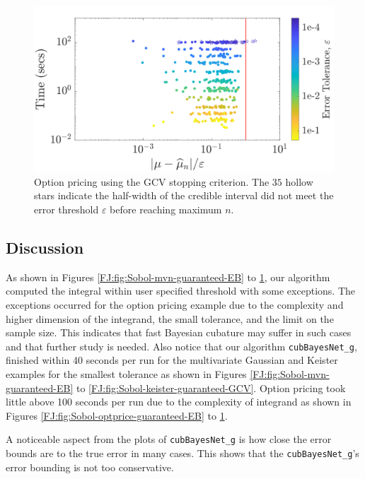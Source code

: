 \documentclass[graybox,footinfo]{svmult}
\begin{document}
\begin{figure}
\centering
\includegraphics[width=0.95\linewidth]{"figures/Sobol/Sobol_optPrice_guaranteed_time_GCV__d12_r1_2019-Sep-1"}
\caption[Sobol: Option pricing guaranteed: GCV]{Option pricing using the GCV stopping criterion. The $35$ hollow stars indicate the half-width of the credible interval did not meet the error threshold $\varepsilon$ before reaching maximum $n$. 
}
\label{FJ:fig:Sobol-optprice-guaranteed-GCV}
\end{figure}




\subsection{Discussion}


As shown in Figures \ref{FJ:fig:Sobol-mvn-guaranteed-EB} to \ref{FJ:fig:Sobol-optprice-guaranteed-GCV}, our algorithm computed the integral within user specified threshold with some exceptions. The exceptions occurred for the  option pricing example due to the complexity and higher dimension of the integrand, the small tolerance, and the limit on the sample size.  This indicates that fast Bayesian cubature may suffer in such cases and that further study is needed. 
Also notice that our algorithm \texttt{cubBayesNet\_g}, finished within 40 seconds per run for the multivariate Gaussian and Keister examples  for the smallest tolerance as shown in Figures \ref{FJ:fig:Sobol-mvn-guaranteed-EB} to \ref{FJ:fig:Sobol-keister-guaranteed-GCV}. Option pricing took little above 100 seconds per run due to the complexity of integrand as shown in Figures \ref{FJ:fig:Sobol-optprice-guaranteed-EB} to \ref{FJ:fig:Sobol-optprice-guaranteed-GCV}.

A  noticeable aspect from the plots of \texttt{cubBayesNet\_g} is how close the error bounds are to the true error in many cases. 
This shows that the \texttt{cubBayesNet\_g}'s error bounding is not too conservative.
\end{document}
